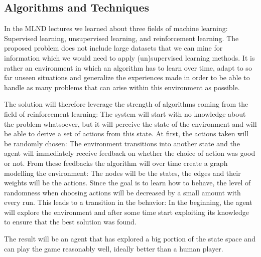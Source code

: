 \documentclass[a4paper,10pt]{article}
\begin{document}
\subsection{Algorithms and Techniques}
\label{algorithms}

In the MLND lectures we learned about three fields of machine learning: Supervised learning, unsupervised learning, and reinforcement learning.
The proposed problem does not include large datasets that we can mine for information which we would need to apply (un)supervised learning methods. 
It is rather an environment in which an algorithm has to learn over time, adapt to so far unseen  situations and generalize the experiences made in order to be able to handle as many problems that can arise within this environment as possible.

The solution will therefore leverage the strength of algorithms coming from the field of reinforcement learning:
The system will start with no knowledge about the problem whatsoever, but it will perceive the state of the environment and will be able to derive a set of actions from this state.
At first, the actions taken will be randomly chosen: 
The environment transitions into another state and the agent will immediately receive feedback on whether the choice of action was good or not.
From these feedbacks the algorithm will over time create a graph modelling the environment:
The nodes will be the states, the edges and their weights will be the actions.
Since the goal is to learn how to behave, the level of randomness when choosing actions will be decreased by a small amount with every run.
This leads to a transition in the behavior: In the beginning, the agent will explore the environment and after some time start exploiting its knowledge to ensure that the best solution was found.

The result will be an agent that has explored a big portion of the state space and can play the game reasonably well, ideally better than a human player.
\end{document}
